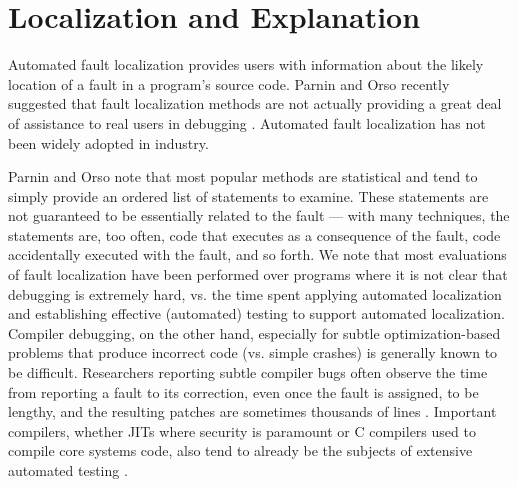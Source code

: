 \section{Localization and Explanation}

Automated fault localization \cite{FaultSurvey,Jones2002} provides users with
information about the likely location of a fault in a program's source
code.    Parnin and Orso recently
suggested that fault localization methods are not actually providing a
great deal of assistance to real users in debugging \cite{AutoHelp}.
Automated fault localization has not been widely adopted in industry.

Parnin and Orso note that most popular methods are
statistical and tend to simply provide an ordered list of statements
to examine.  These statements are not guaranteed to be essentially
related to the fault --- with many techniques, the statements are,
too often, code that executes as a consequence of the fault, code
accidentally executed with the fault, and so forth.  We note that most
evaluations of fault localization have been performed over programs
where it is not clear that debugging is extremely hard, vs. the time
spent applying automated localization and establishing effective
(automated) testing to support automated localization.  Compiler
debugging, on the other hand, especially for subtle optimization-based
problems that produce incorrect code (vs. simple crashes) is generally
known to be difficult.
Researchers reporting subtle compiler bugs often observe the time from
reporting a fault to its correction, even once the fault is assigned,
to be lengthy, and the resulting patches are sometimes thousands of
lines \cite{PLDI13}.  Important compilers, whether JITs where security is paramount
or C compilers used to compile core systems code, also tend to already
be the
subjects of extensive automated testing \cite{jsfunfuzz,csmith}.


